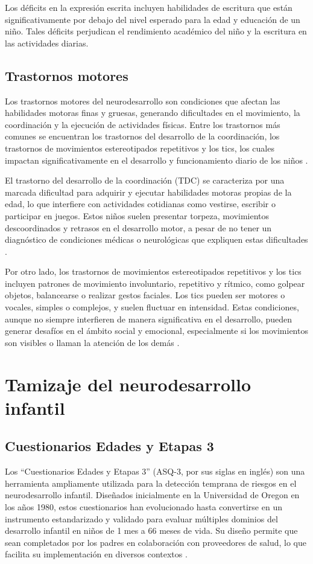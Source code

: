 Los déficits en la expresión escrita incluyen habilidades de escritura que
están significativamente por debajo del nivel esperado para la edad y
educación de un niño. Tales déficits perjudican el rendimiento académico del
niño y la escritura en las actividades diarias.

\subsection{Trastornos motores}
Los trastornos motores del neurodesarrollo son condiciones que afectan las
habilidades motoras finas y gruesas, generando dificultades en el movimiento,
la coordinación y la ejecución de actividades físicas. Entre los trastornos más
comunes se encuentran los trastornos del desarrollo de la coordinación, los
trastornos de movimientos estereotipados repetitivos y los tics, los cuales
impactan significativamente en el desarrollo y funcionamiento diario de los
niños \cite{DSM5TR}.

El trastorno del desarrollo de la coordinación (TDC) se caracteriza por una
marcada dificultad para adquirir y ejecutar habilidades motoras propias de la
edad, lo que interfiere con actividades cotidianas como vestirse, escribir o
participar en juegos. Estos niños suelen presentar torpeza, movimientos
descoordinados y retrasos en el desarrollo motor, a pesar de no tener un
diagnóstico de condiciones médicas o neurológicas que expliquen estas
dificultades \cite{DSM5TR}.

Por otro lado, los trastornos de movimientos estereotipados repetitivos y los
tics incluyen patrones de movimiento involuntario, repetitivo y rítmico, como
golpear objetos, balancearse o realizar gestos faciales. Los tics pueden ser
motores o vocales, simples o complejos, y suelen fluctuar en intensidad. Estas
condiciones, aunque no siempre interfieren de manera significativa en el
desarrollo, pueden generar desafíos en el ámbito social y emocional,
especialmente si los movimientos son visibles o llaman la atención de los
demás \cite{DSM5TR}.

\section{Tamizaje del neurodesarrollo infantil}
\subsection{Cuestionarios Edades y Etapas 3}
Los ``Cuestionarios Edades y Etapas 3'' (ASQ-3, por sus siglas en inglés) son
una herramienta ampliamente utilizada para la detección temprana de riesgos en
el neurodesarrollo infantil. Diseñados inicialmente en la Universidad de Oregon
en los años 1980, estos cuestionarios han evolucionado hasta convertirse en un
instrumento estandarizado y validado para evaluar múltiples dominios del
desarrollo infantil en niños de 1 mes a 66 meses de vida. Su diseño permite que
sean completados por los padres en colaboración con proveedores de salud, lo
que facilita su implementación en diversos contextos
\cite{Singh2017, ASQ4decades}.

